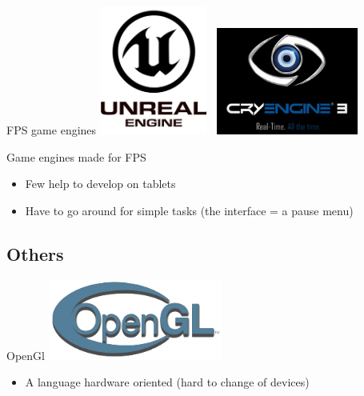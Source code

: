 \documentclass[a4paper,10pt]{beamer}
\begin{document}
			\begin{frame}{FPS game engines}
				\includegraphics[height=120pt]{images/logos/Unreal_Engine.png}  \mbox{     }\includegraphics[height=100pt]{images/logos/Cry_Engine.png}
				
				Game engines made for FPS
				\begin{itemize}
					\item Few help to develop on tablets
					\item Have to go around for simple tasks (the interface = a pause menu)
				\end{itemize}
			\end{frame}
			
			
		\subsection{Others}
		
			\begin{frame}{OpenGl}
				\includegraphics[height=75pt]{images/logos/OpenGL_logo.png}
				\begin{itemize}
					\item A language hardware oriented (hard to change of devices)
				\end{itemize}
			\end{frame}
			
\end{document}
